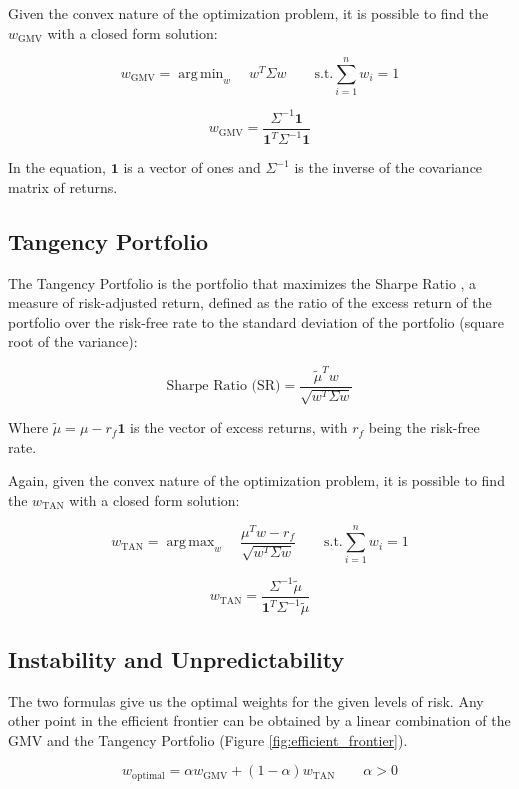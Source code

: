 \documentclass{article}
\DeclareMathOperator*{\argmin}{arg\,min}
\DeclareMathOperator*{\argmax}{arg\,max}
\begin{document}
Given the convex nature of the optimization problem, it is possible to find the $w_{\text{GMV}}$ with a closed form solution:

$$
{w}_{\text{GMV}} = \argmin_{w} \quad w^{T} \Sigma w \quad \quad
\text{s.t.} \sum_{i=1}^{n} w_{i} = 1
$$

$$
{w}_{\text{GMV}} = \frac{\Sigma^{-1} \mathbf{1}}{\mathbf{1}^{T} \Sigma^{-1} \mathbf{1}}
$$

In the equation, $\mathbf{1}$ is a vector of ones and $\Sigma^{-1}$ is the inverse of the covariance matrix of returns.

\FloatBarrier
\subsection{Tangency Portfolio}
The Tangency Portfolio is the portfolio that maximizes the Sharpe Ratio \cite{sharpe1964capital}, a measure of risk-adjusted return, defined as the ratio of the excess return of the portfolio over the risk-free rate to the standard deviation of the portfolio (square root of the variance):

$$
\text{Sharpe Ratio (SR)} = \frac{\tilde{\mu}^{T} w}{\sqrt{w^{T} \Sigma w}}
$$

Where $\tilde{\mu} = \mu - r_f \mathbf{1}$ is the vector of excess returns, with $r_f$ being the risk-free rate.

Again, given the convex nature of the optimization problem, it is possible to find the $w_{\text{TAN}}$ with a closed form solution:

$$
w_{\text{TAN}} = \argmax_{w} \quad \frac{\mu^{T} w - r_f}{\sqrt{w^{T} \Sigma w}} \quad \quad
\text{s.t.} \sum_{i=1}^{n} w_{i} = 1
$$

$$
w_{\text{TAN}} = \frac{\Sigma^{-1} \tilde{\mu}}{\mathbf{1}^{T} \Sigma^{-1} \tilde{\mu}}
$$

\FloatBarrier
\subsection{Instability and Unpredictability}
The two formulas give us the optimal weights for the given levels of risk. Any other point in the efficient frontier can be obtained by a linear combination of the GMV and the Tangency Portfolio (Figure \ref{fig:efficient_frontier}).

$$
w_{\text{optimal}} = \alpha w_{\text{GMV}} + (1 - \alpha) w_{\text{TAN}} \quad \quad \alpha > 0
$$
\end{document}
